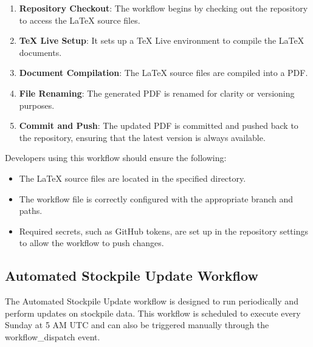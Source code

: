 \begin{enumerate}
\item \textbf{Repository Checkout}: The workflow begins by checking out the repository to access the LaTeX source files.
\item \textbf{TeX Live Setup}: It sets up a TeX Live environment to compile the LaTeX documents.
\item \textbf{Document Compilation}: The LaTeX source files are compiled into a PDF.
\item \textbf{File Renaming}: The generated PDF is renamed for clarity or versioning purposes.
\item \textbf{Commit and Push}: The updated PDF is committed and pushed back to the repository, ensuring that the latest version is always available.
\end{enumerate}


Developers using this workflow should ensure the following:

\begin{itemize}
\item The LaTeX source files are located in the specified directory.
\item The workflow file is correctly configured with the appropriate branch and paths.
\item Required secrets, such as GitHub tokens, are set up in the repository settings to allow the workflow to push changes.
\end{itemize}







\subsection{Automated Stockpile Update Workflow}

The Automated Stockpile Update workflow is designed to run periodically and perform updates on stockpile data. This workflow is scheduled to execute every Sunday at 5 AM UTC and can also be triggered manually through the workflow\_dispatch event.

